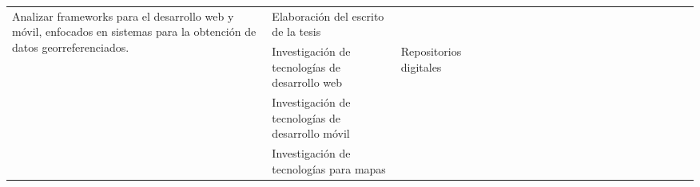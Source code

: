 \begin{landscape}
\begin{ThreePartTable}
\begin{longtable}{|p{}|p{5.5cm}|p{4cm}|l|l|l|l|l|l|l|l|l|l|l|l|l|l|l|l|l|l|l|}
            \hline
            \multirow{6}{0.41\textwidth}{Analizar frameworks para el desarrollo web y móvil, enfocados en sistemas para la obtención
            de datos georreferenciados.}                                        & Elaboración del escrito de la tesis                                 &                                                                                                                     & \cellcolor{green!25}                  & \cellcolor{green!25}                  & \cellcolor{green!25}                  & \cellcolor{green!25}                  & \cellcolor{green!25} & \cellcolor{green!25} & \cellcolor{green!25} & \cellcolor{green!25} & \cellcolor{green!25} & \cellcolor{green!25} & \cellcolor{green!25} & \cellcolor{green!25} & \cellcolor{green!25} & \cellcolor{green!25} &                      \\
            \cline{2-2}\cline{4-21}
                                                                                & Investigación de tecnologías de desarrollo web                      & Repositorios digitales                                                                                              & \cellcolor{green!25}                  &                                       &                                       &                                       &                      &                      &                      &                      &                      &                      &                      &                      &                      &                      &                      \\
            \cline{2-2}\cline{4-21}
                                                                                & Investigación de tecnologías de desarrollo móvil                    &                                                                                                                     & \cellcolor{green!25}                  &                                       &                                       &                                       &                      &                      &                      &                      &                      &                      &                      &                      &                      &                      &                      \\
            \cline{2-2}\cline{4-21}
                                                                                & Investigación de tecnologías para mapas                             &                                                                                                                     &                                       & \cellcolor{green!25}                  &                                       &                                       &                      &                      &                      &                      &                      &                      &                      &                      &                      &                      &                      \\

\end{longtable}
\end{ThreePartTable}
\end{landscape}
